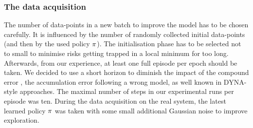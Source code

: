 \documentclass[
reprint,
amsmath,amssymb,amsfonts,clevref,
aps,
prstab,
]{revtex4-2}
\newcommand{\tocheck}[1]{\textcolor{blue}{#1}}
\begin{document}
\subsubsection{The data acquisition}
The number of data-points in a new batch to improve the model has to be chosen carefully. It is influenced by the number of randomly collected initial data-points (and then by the used policy $\pi$). The initialisation phase has to be selected not to small to minimise risks getting trapped in a local minimum for too long. Afterwards, from our experience, at least one full episode per epoch should be taken. We decided to use a short horizon to diminish the impact of the compound error \cite{Janner2019}, the accumulation error following a wrong model, as well known in DYNA-style approaches. The maximal number of steps in our experimental runs per episode was ten. During the data acquisition on the real system, the latest learned policy $\pi$ was taken with some small additional Gaussian noise to improve exploration.
\end{document}
